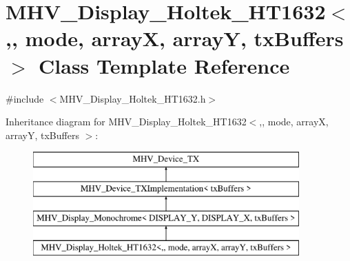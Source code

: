 \hypertarget{class_m_h_v___display___holtek___h_t1632}{\section{M\-H\-V\-\_\-\-Display\-\_\-\-Holtek\-\_\-\-H\-T1632$<$,, mode, array\-X, array\-Y, tx\-Buffers $>$ Class Template Reference}
\label{class_m_h_v___display___holtek___h_t1632}
}


{\ttfamily \#include $<$M\-H\-V\-\_\-\-Display\-\_\-\-Holtek\-\_\-\-H\-T1632.\-h$>$}

Inheritance diagram for M\-H\-V\-\_\-\-Display\-\_\-\-Holtek\-\_\-\-H\-T1632$<$,, mode, array\-X, array\-Y, tx\-Buffers $>$\-:\begin{figure}[H]
\begin{center}
\leavevmode
\includegraphics[height=4.000000cm]{class_m_h_v___display___holtek___h_t1632}
\end{center}
\end{figure}
